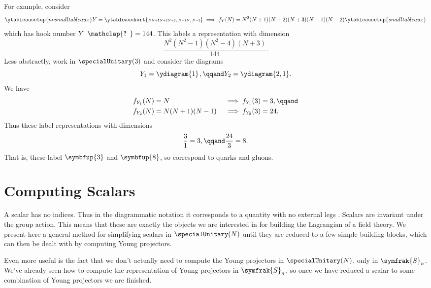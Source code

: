 \documentclass[fleqn]{NotesClass}
\newcommand{\symmetricGroup}[1][n]{\symfrak{S}_{#1}}
\newcommand{\hooknumber}[1]{#1{\phantom{?}\mkern1mu\mathclap{\ooalign{\hfil ? \hfil \cr \hfil ! \hfil}}}}
\newcommand{\rep}[1]{\symbfup{#1}}
\begin{document}
    For example, consider
    \begin{equation}
        \ytableausetup{nosmalltableaux}
        Y = \ytableaushort{{\scriptscriptstyle N}{\scriptscriptstyle N+1}{\scriptscriptstyle N+2}{\scriptscriptstyle N+3},{\scriptscriptstyle N-1}{\scriptscriptstyle N},{\scriptscriptstyle N-2}} \implies f_Y(N) = N^2(N + 1)(N + 2)(N + 3)(N - 1)(N - 2)
        \ytableausetup{smalltableaux}
    \end{equation}
    which has hook number \(\hooknumber{Y} = 144\).
    This labels a representation with dimension
    \begin{equation}
        \frac{N^2(N^2 - 1)(N^2 - 4)(N + 3)}{144}.
    \end{equation}
    Less abstractly, work in \(\specialUnitary(3)\) and consider the diagrams
    \begin{equation}
        Y_1 = \ydiagram{1}\mkern2mu, \qqand Y_2 = \ydiagram{2,1}.
    \end{equation}
    We have
    \begin{align}
        f_{Y_1}(N) &= N &&\implies f_{Y_1}(3) = 3, \qqand\\
        f_{Y_2}(N) &= N(N + 1)(N - 1) &&\implies f_{Y_2}(3) = 24.
    \end{align}
    Thus these label representations with dimensions
    \begin{equation}
        \frac{3}{1} = 3, \qqand \frac{24}{3} = 8.
    \end{equation}
    That is, these label \(\rep{3}\) and \(\rep{8}\), so correspond to quarks and gluons.
    
    \section{Computing Scalars}
    A scalar has no indices.
    Thus in the diagrammatic notation it corresponds to a quantity with no external legs \cite[45]{cvitanovic}.
    Scalars are invariant under the group action.
    This means that these are exactly the objects we are interested in for building the Lagrangian of a field theory.
    We present here a general method for simplifying scalars in \(\specialUnitary(N)\) until they are reduced to a few simple building blocks, which can then be dealt with by computing Young projectors.
    
    Even more useful is the fact that we don't actually need to compute the Young projectors in \(\specialUnitary(N)\), only in \(\symmetricGroup\).
    We've already seen how to compute the representation of Young projectors in \(\symmetricGroup\), so once we have reduced a scalar to some combination of Young projectors we are finished.
    
\end{document}
